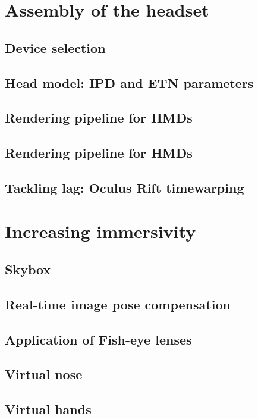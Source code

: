 


\section{Assembly of the headset}

\subsection{Device selection}

\subsection{Head model: IPD and ETN parameters}

\subsection{Rendering pipeline for HMDs}

\subsection{Rendering pipeline for HMDs}

\subsection{Tackling lag: Oculus Rift timewarping}



\section{Increasing immersivity}

\subsection{Skybox}

\subsection{Real-time image pose compensation}

\subsection{Application of Fish-eye lenses}

\subsection{Virtual nose}

\subsection{Virtual hands}